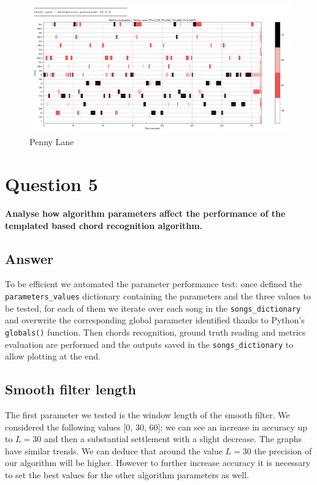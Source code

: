 \documentclass[
	12pt, %
]{fphw}
\begin{document}
{\begin{figure}[H]
 \centering
 \includegraphics[scale=1]{./images/4_penny_lane_metrics.png}
 \caption{Penny Lane}
\end{figure}

\newpage
\section*{\color{red}Question 5}

\begin{problem}
	\textbf{Analyse how algorithm parameters affect the performance of the templated based chord recognition algorithm.}
\end{problem}

\subsection*{\color{blue}Answer}

To be efficient we automated the parameter performance test: once defined the \verb|parameters_values| dictionary containing the parameters and the three values to be tested, for each of them we iterate over each song in the \verb|songs_dictionary| and overwrite the corresponding global parameter identified thanks to Python's \verb|globals()| function.
Then chords recognition, ground truth reading and metrics evaluation are performed and the outputs saved in the \verb|songs_dictionary| to allow plotting at the end.

\subsection*{Smooth filter length}

The first parameter we tested is the window length of the smooth filter. We considered the following values [0, 30, 60]: we can see an increase in accuracy up to $L=30$ and then a substantial settlement with a slight decrease. The graphs have similar trends.
We can deduce that around the value $L=30$ the precision of our algorithm will be higher. However to further increase accuracy it is necessary to set the best values for the other algorithm parameters as well.

}
\end{document}
